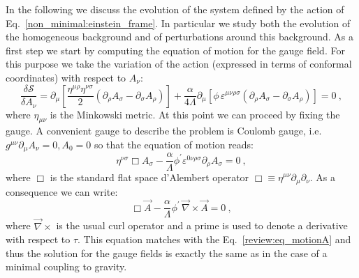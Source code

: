In the following we discuss the evolution of the system defined by the action of Eq.~\eqref{non_minimal:einstein_frame}. In particular we study both the evolution of the homogeneous background and of perturbations around this background. As a first step we start by computing the equation of motion for the gauge field. For this purpose we take the variation of the action (expressed in terms of conformal coordinates) with respect to $A_{\nu}$:
\begin{equation}
\frac{\delta \mathcal{S}}{\delta A_{\nu}}  = \partial_{\mu} \left[ \frac{\eta^{\mu\rho}\eta^{\nu\sigma}}{2}\left( \partial_{\rho} A_{\sigma} - \partial_{\sigma} A_{\rho} \right) \right] + \frac{\alpha}{4 \Lambda} \partial_{\mu} \left[ \phi \, \varepsilon^{\mu\nu\rho\sigma} \left( \partial_{\rho} A_{\sigma} - \partial_{\sigma} A_{\rho} \right) \right] = 0 \ ,
\end{equation}
where $\eta_{\mu \nu}$ is the Minkowski metric. At this point we can proceed by fixing the gauge. A convenient gauge to describe the problem is Coulomb gauge, i.e.\ $g^{\mu \nu }\partial_{\mu} A_{\nu} = 0 , A_0 = 0$ so that the equation of motion reads:
\begin{equation}
\eta^{\nu\sigma} \Box A_{\sigma} - \frac{\alpha}{\Lambda} \phi^{\prime} \varepsilon^{0\nu\rho\sigma} \partial_{\rho} A_{\sigma} = 0 \ , 
\end{equation}
where $\Box$ is the standard flat space d'Alembert operator $\Box \equiv \eta^{\mu\nu} \partial_{\mu} \partial_{\nu}$. As a consequence we can write:
\begin{equation}
\label{non_minimal:gauge_fields}
\Box \vec{A}  - \frac{\alpha}{\Lambda} \phi^{\prime} \, \vec{\nabla} \times \vec{A} = 0 \ , 
\end{equation}
where $\vec{\nabla} \times $ is the usual curl operator and a prime is used to denote a derivative with respect to $\tau$. This equation matches with the Eq.~\eqref{review:eq_motionA} and thus the solution for the gauge fields is exactly the same as in the case of a minimal coupling to gravity.

